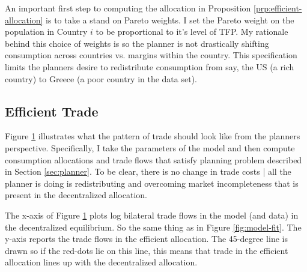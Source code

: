 \documentclass[12pt,pdftex]{article}
\begin{document}
\begin{onehalfspacing}
\begin{figure}[!t]
\caption{}\label{fig:planner-trade}
\end{figure}

An important first step to computing the allocation in Proposition \ref{prp:efficient-allocation} is to take a stand on Pareto weights. I set the Pareto weight on the population in Country $i$ to be proportional to it's level of TFP. My rationale behind this choice of weights is so the planner is not drastically shifting consumption across countries vs. margins within the country. This specification limits the planners desire to redistribute consumption from say, the US (a rich country) to Greece (a poor country in the data set).

\subsection{Efficient Trade}

Figure \ref{fig:planner-trade} illustrates what the pattern of trade should look like from the planners perspective. Specifically, I take the parameters of the model and then compute consumption allocations and trade flows that satisfy planning problem described in Section \ref{sec:planner}. To be clear, there is no change in trade costs | all the planner is doing is redistributing and overcoming market incompleteness that is present in the decentralized allocation. 

The x-axis of Figure \ref{fig:planner-trade} plots log bilateral trade flows in the model (and data) in the decentralized equilibrium. So the same thing as in Figure \ref{fig:model-fit}. The y-axis reports the trade flows in the efficient allocation. The 45-degree line is drawn so if the red-dots lie on this line, this means that trade in the efficient allocation lines up with the decentralized allocation.


\end{onehalfspacing}
\end{document}
